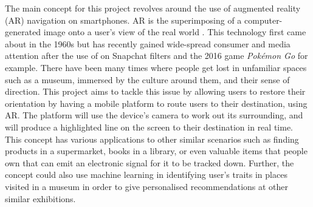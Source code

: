 
The main concept for this project revolves around the use of augmented reality (AR) navigation on smartphones. AR is the superimposing of a computer-generated image onto a user's view of the real world \cite{oxforddict}. This technology first came about in the 1960s \cite{InteractionDesign} but has recently gained wide-spread consumer and media attention after the use of on Snapchat filters \cite{Snapchat} and the 2016 game \textit{Pokémon Go} for example. There have been many times where people get lost in unfamiliar spaces such as a museum, immersed by the culture around them, and their sense of direction. This project aims to tackle this issue by allowing users to restore their orientation by having a mobile platform to route users to their destination, using AR. The platform will use the device's camera to work out its surrounding, and will produce a highlighted line on the screen to their destination in real time.\\

This concept has various applications to other similar scenarios such as finding products in a supermarket, books in a library, or even valuable items that people own that can emit an electronic signal for it to be tracked down. Further, the concept could also use machine learning in identifying user's traits in places visited in a museum in order to give personalised recommendations at other similar exhibitions.

